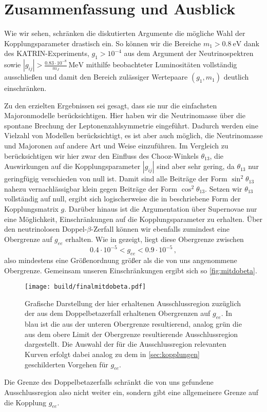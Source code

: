 \chapter{Zusammenfassung und Ausblick}

Wie wir sehen, schränken die diskutierten Argumente die mögliche Wahl der Kopplungsparameter drastisch ein.
So können wir die Bereiche $m_1 > \SI{0.8}{\eV}$ dank des KATRIN-Experiments, $g_1 > 10^{-4}$ aus dem Argument der Neutrinospektren sowie $|g_{i j}| > \frac{\num{0.83} \cdot 10^{-8}}{m_J} \,\si{\mega\eV}$
mithilfe beobachteter Luminositäten vollständig ausschließen und damit den Bereich zulässiger Wertepaare
$(g_1,m_1)$ deutlich einschränken.

Zu den erzielten Ergebnissen sei gesagt, dass sie nur die einfachsten Majoronmodelle berücksichtigen.
Hier haben wir die Neutrinomasse über die spontane Brechung der Leptonenzahlsymmetrie eingeführt.
Dadurch werden eine Vielzahl von Modellen berücksichtigt, es ist aber auch möglich, die Neutrinomasse und Majoronen auf andere Art und Weise einzuführen.
Im Vergleich zu \cite{päspaper} berücksichtigen wir hier zwar den Einfluss des Chooz-Winkels $\theta_{1 3}$, die Auswirkungen auf die Kopplungsparameter $|g_{i j}|$ sind aber sehr gering, da $\theta_{13}$ nur geringfügig verschieden von null ist.
Damit sind alle Beiträge der Form $\sin^2 \theta_{13}$ nahezu vernachlässigbar klein gegen Beiträge der Form $\cos^2\theta_{13}$.
Setzen wir $\theta_{13}$ vollständig auf null, ergibt sich logischerweise die in \cite{päspaper} beschriebene Form der Kopplungsmatrix $g$.
Darüber hinaus ist die Argumentation über Supernovae nur eine Möglichkeit, Einschränkungen auf die Kopplungsparameter zu erhalten.
Über den neutrinolosen Doppel-$\beta$-Zerfall können wir ebenfalls zumindest eine Obergrenze auf $g_{ee}$ erhalten.
Wie in \cite{hauhau} gezeigt, liegt diese Obergrenze zwischen
\begin{equation}
    \num{0.4} \cdot 10^{-5} < g_{ee} < \num{0.9} \cdot 10^{-5} \,,
    \label{eq:g_eedoppelbeta}
\end{equation} 
also mindestens eine Größenordnung größer als die von uns angenommene Obergrenze.
Gemeinsam unseren Einschränkungen ergibt sich so \autoref{fig:mitdobeta}.
\begin{figure}[H]
    \centering
    \texttt{[image: build/finalmitdobeta.pdf]}
    \caption{Grafische Darstellung der hier erhaltenen Ausschlussregion zuzüglich der aus dem Doppelbetazerfall erhaltenen Obergrenzen auf $g_{ee}$. In blau ist die aus der unteren Obergrenze resultierend, 
    analog grün die aus dem obere Limit der Obergrenze resultierende Ausschlussregion dargestellt. Die Auswahl der für die Ausschlussregion relevanten Kurven erfolgt dabei analog zu dem in \autoref{sec:kopplungen}
    geschilderten Vorgehen für $g_{ee}$.}
    \label{fig:mitdobeta}
\end{figure}
Die Grenze des Doppelbetazerfalls schränkt die von uns gefundene Ausschlussregion also nicht weiter ein, sondern gibt eine allgemeinere Grenze auf die Kopplung $g_{ee}$.

